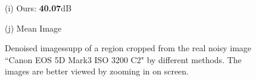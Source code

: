 \documentclass[10pt,onecolumn,letterpaper]{article}
\begin{document}
\begin{figure}[H]
{\begin{minipage}[t]{0.195\textwidth}
{\footnotesize (i) Ours: \textbf{40.07}dB  }
\end{minipage}
\begin{minipage}[t]{0.195\textwidth}
\centering
{}
{\footnotesize (j) Mean Image \cite{crosschannel2016} }
\end{minipage}
}
\caption{Denoised imagessupp of a region cropped from the real noisy image ``Canon EOS 5D Mark3 ISO 3200 C2" \cite{crosschannel2016} by different methods. The images are better viewed by zooming in on screen.} 
\label{fig11}
\end{figure}
\end{document}
